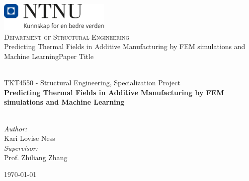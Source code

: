 


\def\TOPIC{TKT4550 - Structural Engineering, Specialization Project}

\def\TITLE{Predicting Thermal Fields in Additive
Manufacturing by FEM simulations and
Machine Learning}

\def\AUTHORS{
    Kari Lovise Ness \\

}
\def\SUPERVISOR{
    Prof. Zhiliang Zhang}



\begin{titlepage}

\vbox{ }

\vbox{ }

\begin{center}
\includegraphics[width=0.40\textwidth]{Images/NTNU_logo.png}\\[1cm]
\textsc{\LARGE Department of Structural Engineering}\\[1.0cm]


\def\checktitle{Paper Title}
\ifx\TITLE\checktitle
\fi

\vbox{ }
\HRule \\[0.4cm]
{ \large \TOPIC } \\[0.3cm]
{ \huge \bfseries \TITLE}\\[0.4cm]
\HRule \\[1.5cm]

\large


\emph{Author:}\\
\AUTHORS
\vspace{0.5cm}
\emph{Supervisor:}\\
\SUPERVISOR


\vfill
{\large \today}
\end{center}
\end{titlepage}








